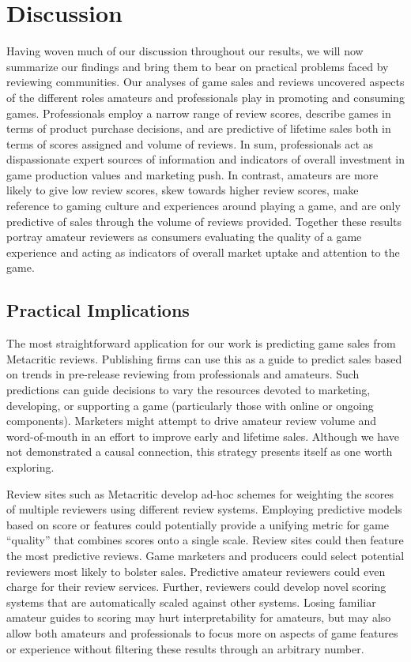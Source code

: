 \documentclass[letterpaper]{article}
\begin{document}
\section{Discussion}
Having woven much of our discussion throughout our results, we will
now summarize our findings and bring them to bear on practical problems
faced by reviewing communities. Our analyses of game sales and reviews uncovered aspects of the different roles amateurs and professionals play in promoting and consuming games. Professionals employ a narrow range of review scores, describe games in terms of product purchase decisions, and are predictive of lifetime sales both in terms of scores assigned and volume of reviews. In sum, professionals act as dispassionate expert sources of information and indicators of overall investment in game production values and marketing push. In contrast, amateurs are more likely to give low review scores, skew towards higher review scores, make reference to gaming culture and experiences around playing a game, and are only predictive of sales through the volume of reviews provided. Together these results portray amateur reviewers as consumers evaluating the quality of a game experience and acting as indicators of overall market uptake and attention to the game.

\subsection{Practical Implications}
The most straightforward application for our work is predicting game sales from Metacritic reviews. Publishing firms can use this as a guide to predict sales based on trends in pre-release reviewing from professionals and amateurs. Such predictions can guide decisions to vary the resources devoted to marketing, developing, or supporting a game (particularly those with online or ongoing components). Marketers might attempt to drive amateur review volume and word-of-mouth in an effort to improve early and lifetime sales. Although we have not demonstrated a causal connection, this strategy presents itself as one worth exploring.

Review sites such as Metacritic develop ad-hoc schemes for weighting the scores of multiple reviewers using different review systems. Employing predictive models based on score or features could potentially provide a unifying metric for game ``quality'' that combines scores onto a single scale. Review sites could then feature the most predictive reviews. Game marketers and producers could select potential reviewers most likely to bolster sales. Predictive amateur reviewers could even charge for their review services. Further, reviewers could develop novel scoring systems that are automatically scaled against other systems. Losing familiar amateur guides to scoring may hurt interpretability for amateurs, but may also allow both amateurs and professionals to focus more on aspects of game features or experience without filtering these results through an arbitrary number.
\end{document}

